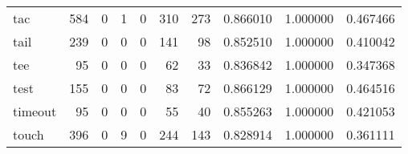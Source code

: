 \begin{tabular}{lrrrrrrrrr}
tac       &                                   584 &                                                  0 &                                                  1 &                                                  0 &                                                310 &                                                273 &                                           0.866010 &                               1.000000 &                             0.467466 \\
tail      &                                   239 &                                                  0 &                                                  0 &                                                  0 &                                                141 &                                                 98 &                                           0.852510 &                               1.000000 &                             0.410042 \\
tee       &                                    95 &                                                  0 &                                                  0 &                                                  0 &                                                 62 &                                                 33 &                                           0.836842 &                               1.000000 &                             0.347368 \\
test      &                                   155 &                                                  0 &                                                  0 &                                                  0 &                                                 83 &                                                 72 &                                           0.866129 &                               1.000000 &                             0.464516 \\
timeout   &                                    95 &                                                  0 &                                                  0 &                                                  0 &                                                 55 &                                                 40 &                                           0.855263 &                               1.000000 &                             0.421053 \\
touch     &                                   396 &                                                  0 &                                                  9 &                                                  0 &                                                244 &                                                143 &                                           0.828914 &                               1.000000 &                             0.361111 \\

\end{tabular}
